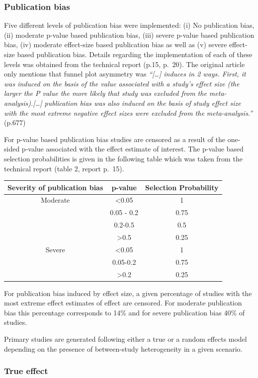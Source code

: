 \documentclass[
  english,
  doc,floatsintext,draftall]{apa6}
\begin{document}
\hypertarget{publication-bias}{%
\subsubsection{Publication bias}\label{publication-bias}}

Five different levels of publication bias were implemented: (i) No publication bias, (ii) moderate p-value based publication bias, (iii) severe p-value based publication bias, (iv) moderate effect-size based publication bias as well as (v) severe effect-size based publication bias.
Details regarding the implementation of each of these levels was obtained from the technical report (p.15, p.~20). The original article only mentions that funnel plot asymmetry was \emph{\enquote{{[}\ldots{]} induces in 2 ways. First, it was induced on the basis of the value associated with a study's effect size (the larger the P value the more likely that study was excluded from the meta-analysis).{[}\ldots{]} publication bias was also induced on the basis of study effect size with the most extreme negative effect sizes were excluded from the meta-analysis.}} (p.677)

For p-value based publication bias studies are censored as a result of the one-sided p-value associated with the effect estimate of interest. The p-value based selection probabilities is given in the following table which was taken from the technical report (table 2, report p.~15).

\begin{longtable}[]{@{}ccc@{}}
\toprule
Severity of publication bias & p-value & Selection Probability\tabularnewline
\midrule
\endhead
Moderate & \textless0.05 & 1\tabularnewline
& 0.05 - 0.2 & 0.75\tabularnewline
& 0.2-0.5 & 0.5\tabularnewline
& \textgreater0.5 & 0.25\tabularnewline
Severe & \textless0.05 & 1\tabularnewline
& 0.05-0.2 & 0.75\tabularnewline
& \textgreater0.2 & 0.25\tabularnewline
\bottomrule
\end{longtable}

For publication bias induced by effect size, a given percentage of studies with the most extreme effect estimates of effect are censored. For moderate publication bias this percentage corresponds to 14\% and for severe publication bias 40\% of studies.

Primary studies are generated following either a true or a random effects model depending on the presence of between-study heterogeneity in a given scenario.

\hypertarget{true-effect}{%
\subsubsection{True effect}\label{true-effect}}
\end{document}
